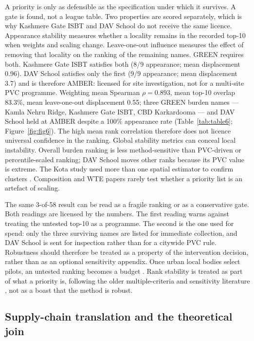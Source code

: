 \documentclass[12pt,a4paper]{article}
\begin{document}
A priority is only as defensible as the specification under which it survives. A gate is found, not a league table. Two properties are scored separately, which is why Kashmere Gate ISBT and DAV School do not receive the same licence. Appearance stability measures whether a locality remains in the recorded top-10 when weights and scaling change. Leave-one-out influence measures the effect of removing that locality on the ranking of the remaining names. GREEN requires both. Kashmere Gate ISBT satisfies both (8/9 appearance; mean displacement 0.96). DAV School satisfies only the first (9/9 appearance; mean displacement 3.7) and is therefore AMBER: licensed for site investigation, not for a multi-site PVC programme. Weighting mean Spearman $\rho=0.893$, mean top-10 overlap 83.3\%, mean leave-one-out displacement 0.55; three GREEN burden names --- Kamla Nehru Ridge, Kashmere Gate ISBT, CBD Karkardooma --- and DAV School held at AMBER despite a 100\% appearance rate (Table~\ref{tab:table6}; Figure~\ref{fig:fig6}). The high mean rank correlation therefore does not licence universal confidence in the ranking. Global stability metrics can conceal local instability. Overall burden ranking is less method-sensitive than PVC-driven or percentile-scaled ranking; DAV School moves other ranks because its PVC value is extreme. The Kota study used more than one spatial estimator to confirm clusters \citep{ieam_kota_landuse_msw_2026}. Composition and WTE papers rarely test whether a priority list is an artefact of scaling.

The same 3-of-58 result can be read as a fragile ranking or as a conservative gate. Both readings are licensed by the numbers. The first reading warns against treating the untested top-10 as a programme. The second is the one used for spend: only the three surviving names are listed for immediate collection, and DAV School is sent for inspection rather than for a citywide PVC rule. Robustness should therefore be treated as a property of the intervention decision, rather than as an optional sensitivity appendix. Once urban local bodies select pilots, an untested ranking becomes a budget \citep{cpcb_pwm_amendment_2026}. Rank stability is treated as part of what a priority is, following the older multiple-criteria and sensitivity literature \citep{belton_stewart_2002,saltelli_sensitivity_2008}, not as a boast that the method is robust.

\subsection{Supply-chain translation and the theoretical join}
\end{document}
